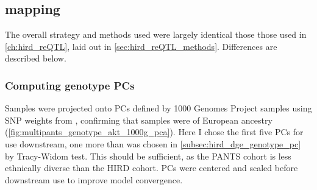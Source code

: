 \subsection{ mapping}

The overall strategy and methods used were largely identical those those used in \cref{ch:hird_reQTL}, laid out in \cref{sec:hird_reQTL_methods}.
Differences are described below.

\subsubsection{Computing genotype PCs}

Samples were projected onto \glspl{PC} defined by 1000 Genomes Project samples using \gls{SNP} weights from ,
confirming that samples were of European ancestry (\cref{fig:multipants_genotype_akt_1000g_pca}).
Here I chose the first five \glspl{PC} for use downstream, one more than was chosen in \cref{subsec:hird_dge_genotype_pc} by Tracy-Widom test.
This should be sufficient, as the \gls{PANTS} cohort is less ethnically diverse than the \gls{HIRD} cohort.
\glspl{PC} were centered and scaled before downstream use to improve model convergence.

